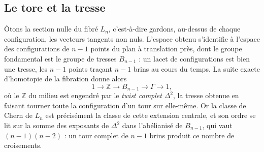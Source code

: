 \documentclass[11pt,a4paper]{amsart}
\theoremstyle{definition}
\theoremstyle{plain}
\theoremstyle{remark}
\begin{document}
\subsection{Le tore et la tresse}

Ôtons la section nulle du fibré $L_n$, c'est-à-dire gardons, au-dessus de chaque configuration, les vecteurs tangents non nuls. L'espace obtenu s'identifie à l'espace des configurations de $n-1$ points du plan à translation près, dont le groupe fondamental est le groupe de tresses $B_{n-1}$ : un lacet de configurations est bien une tresse, les $n-1$ points traçant $n-1$ brins au cours du temps. La suite exacte d'homotopie de la fibration donne alors
\[
1 \longrightarrow \mathbb Z \longrightarrow B_{n-1} \longrightarrow \Gamma \longrightarrow 1,
\]
où le $\mathbb Z$ du milieu est engendré par le \emph{twist complet} $\Delta^2$, la tresse obtenue en faisant tourner toute la configuration d'un tour sur elle-même. Or la classe de Chern de $L_n$ est précisément la classe de cette extension centrale, et son ordre se lit sur la somme des exposants de $\Delta^2$ dans l'abélianisé de $B_{n-1}$, qui vaut $(n-1)(n-2)$ : un tour complet de $n-1$ brins produit ce nombre de croisements.
\end{document}
